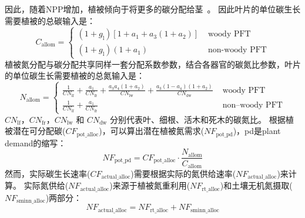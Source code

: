 因此，随着${\mathrm {NPP}}$增加，植被倾向于将更多的碳分配给茎~\citep{allen2005,vanninen2005carbon}。
因此叶片的单位碳生长需要植被的总碳输入是：
\begin{equation}\label{C_allom}
  C_{\mathrm{allom }}=\begin{cases}
    \left(1+g_{\mathrm{l}}\right)\left[1+a_{1}+a_{3}\left(1+a_{2}\right)\right] &  \text{ woody PFT} \\
    \left(1+g_{\mathrm{l}}\right)\left(1+a_{1}\right)  &  \text{ non-woody PFT}
  \end{cases}
\end{equation}
植被氮分配与碳分配共享同样一套分配系数参数，结合各器官的碳氮比参数，叶片的单位碳生长需要植被的总氮输入是：
\begin{equation}\label{N_allom}
  N_{\mathrm{ {allom }}}= \begin{cases}
    \frac{1}{CN_{\mathrm{ {lf }}}}+\frac{a_{1}}{CN_{\mathrm{ {fr }}}}+\frac{a_{3} a_{4}\left(1+a_{2}\right)}
    {CN_{\mathrm{l w}}}+\frac{a_{3}\left(1-a_{4}\right)\left(1+a_{2}\right)}{CN_{\mathrm{d w}}}  &  \text { woody PFT} \\
    \frac{1}{CN_{\mathrm{ {lf }}}}+\frac{a_{1}}{CN_{\mathrm{ {fr }}}} & \text { non--woody PFT}
  \end{cases}
\end{equation}
$CN_{\mathrm{lf}}$，$CN_{\mathrm{fr}}$，$CN_{\mathrm{lw}}$ 和 $CN_{\mathrm{dw}}$ 分别代表叶、细根、活木和死木的碳氮比。
根据植被潜在可分配碳($CF_{\mathrm{pot\_{alloc}}}$)，可以算出潜在植被氮需求($NF_{\mathrm{pot\_{pd}}}$)，pd是plant demand的缩写：
\begin{equation}
  N F_{\mathrm{ {pot\_{pd}}}}=CF_{\mathrm{ {pot\_{alloc }}}} \cdot \frac{N_{\mathrm{ {allom }}}}{C_{\mathrm{ {allom }}}}
\end{equation}
然而，实际碳生长速率($CF_{\mathrm{actual\_{alloc}}}$)需要根据实际的氮供给速率($NF_{\mathrm{actual\_{alloc}}}$)来计算。
实际氮供给($NF_{\mathrm{actual\_{alloc}}}$)来源于植被氮重利用($NF_{\mathrm{rt\_{alloc}}}$)和土壤无机氮摄取($NF_{\mathrm{sminn\_{alloc}}}$)两部分：
\begin{equation}\label{NF_actual_alloc}
  NF_{\mathrm{actual\_{alloc}}}=NF_{\mathrm{rt\_{alloc}}}+NF_{\mathrm{sminn\_{alloc}}}
\end{equation}


